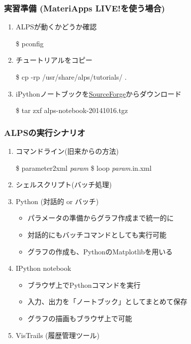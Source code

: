 \begin{frame}[fragile]
  \frametitle{実習準備 (MateriApps LIVE!を使う場合)}
  \begin{enumerate}
  \item ALPSが動くかどうか確認
\begin{semiverbatim}
\$ pconfig
\end{semiverbatim}
  \item チュートリアルをコピー
\begin{semiverbatim}
\$ cp -rp /usr/share/alps/tutorials/ .
\end{semiverbatim}
  \item iPythonノートブックを\href{http://sf.net/projects/alps-tutorial/files/}{SourceForge}からダウンロード
\begin{semiverbatim}
\$ tar zxf alps-notebook-20141016.tgz
\end{semiverbatim}
  \end{enumerate}
\end{frame}

\begin{frame}[fragile]
  \frametitle{ALPSの実行シナリオ}
  \begin{enumerate}
  \item コマンドライン(旧来からの方法)
\begin{semiverbatim}
\$ parameter2xml \textit{param}
\$ loop \textit{param}.in.xml
\end{semiverbatim}
  \item シェルスクリプト(バッチ処理)
  \item Python (対話的 or バッチ)
    \begin{itemize}
    \item パラメータの準備からグラフ作成まで統一的に
    \item 対話的にもバッチコマンドとしても実行可能
    \item グラフの作成も、PythonのMatplotlibを用いる
    \end{itemize}
  \item IPython notebook
    \begin{itemize}
    \item ブラウザ上でPythonコマンドを実行
    \item 入力、出力を「ノートブック」としてまとめて保存
    \item グラフの描画もブラウザ上で可能
    \end{itemize}
  \item VisTrails (履歴管理ツール)
  \end{enumerate}
\end{frame}

